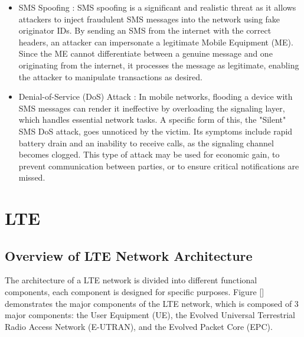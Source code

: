 \documentclass[conference]{IEEEtran}
\begin{document}
\begin{itemize}
\begin{itemize}
    \item SMS Spoofing : SMS spoofing is a significant and realistic threat as it allows attackers to inject fraudulent SMS messages into the network using fake originator IDs.
    By sending an SMS from the internet with the correct headers, an attacker can impersonate a legitimate Mobile Equipment (ME). Since the ME cannot differentiate between a genuine message and one originating from the internet, it processes the message as legitimate, enabling the attacker to manipulate transactions as desired.

    \item Denial-of-Service (DoS) Attack : In mobile networks, flooding a device with SMS messages can render it ineffective by overloading the signaling layer, which handles essential network tasks. 
    A specific form of this, the "Silent" SMS DoS attack, goes unnoticed by the victim. Its symptoms include rapid battery drain and an inability to receive calls, as the signaling channel becomes clogged. 
    This type of attack may be used for economic gain, to prevent communication between parties, or to ensure critical notifications are missed.
 
\end{itemize}
    
\end{itemize}



\section{LTE}
\subsection{Overview of LTE Network Architecture}
The architecture of a LTE network is divided into different functional components, each component is designed for specific purposes. Figure [] demonstrates the major components of the LTE network, which is composed of 3 major components: the User Equipment (UE), the Evolved Universal Terrestrial Radio Access Network (E-UTRAN), and the Evolved Packet Core (EPC).

    
\end{document}
